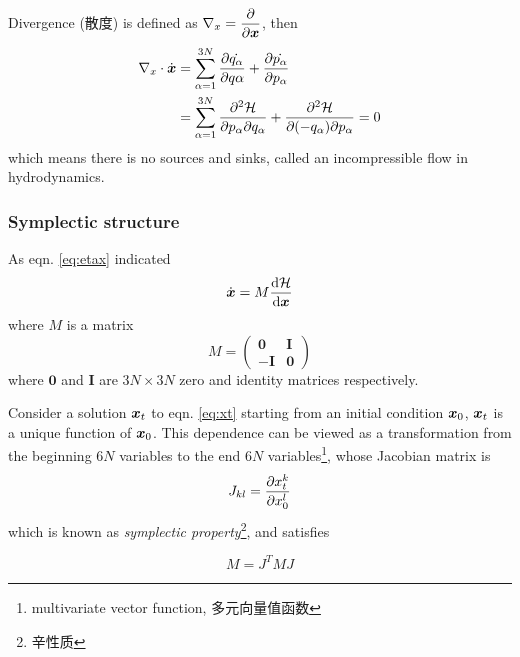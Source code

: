 Divergence (散度) is defined as $\nabla_x=\dfrac{\partial }{\partial \boldsymbol{x}}$, then
\begin{align*}
	\nabla_x\cdot\dot{\boldsymbol{x}}&=\sum_{\alpha=1}^{3N}\dfrac{\partial \dot{q_\alpha}}{\partial q\alpha}+\dfrac{\partial \dot{p_\alpha}}{\partial p_\alpha}\\
	&=\sum_{\alpha=1}^{3N}\dfrac{\partial^2 \mathcal{H}}{\partial p_\alpha \partial q_\alpha}+\dfrac{\partial^2 \mathcal{H}}{\partial (-q_\alpha) \partial p_\alpha}=0
\end{align*}
which means there is no sources and sinks, called an incompressible flow in hydrodynamics.

\subsubsection{Symplectic structure}
As eqn. \ref{eq:etax} indicated
\begin{equation}
	\dot{\boldsymbol{x}}=M\dfrac{\mathrm{d} \mathcal{H}}{\mathrm{d} \boldsymbol{x}} \label{eq:xt}
\end{equation}
where $M$ is a matrix
\begin{equation}
	M=\begin{pmatrix}
		\boldsymbol{0} & \boldsymbol{I}\\
		-\boldsymbol{I}& \boldsymbol{0}
	\end{pmatrix}
\end{equation}
where $\boldsymbol{0}$ and $\boldsymbol{I}$ are $3N\times 3N$ zero and identity matrices respectively.

Consider a solution $\boldsymbol{x}_t$ to eqn. \ref{eq:xt} starting from an initial condition $\boldsymbol{x}_0$, $\boldsymbol{x}_t$ is a unique function of $\boldsymbol{x}_0$. This dependence can be viewed as a transformation from the beginning $6N$ variables to the end $6N$ variables\footnote{multivariate vector function, 多元向量值函数}, whose Jacobian matrix is
\begin{equation}
	J_{kl}=\dfrac{\partial x_t^k}{\partial x_0^l}
\end{equation}
which is known as \textit{symplectic property}\footnote{辛性质}, and satisfies
\begin{tcolorbox}
	\begin{equation}
		M=J^TMJ
	\end{equation}
\end{tcolorbox}

